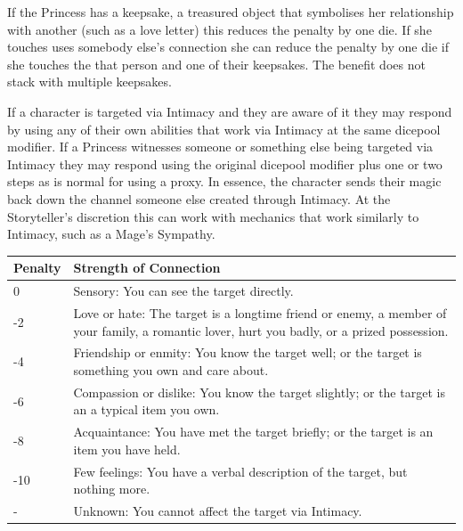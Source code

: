 If the Princess has a keepsake, a treasured object that symbolises her relationship with another (such as a love letter) this reduces the penalty by one die. If she touches uses somebody else's connection she can reduce the penalty by one die if she touches the that person and one of their keepsakes. The benefit does not stack with multiple keepsakes. 

If a character is targeted via Intimacy and they are aware of it they may respond by using any of their own abilities that work via Intimacy at the same dicepool modifier. If a Princess witnesses someone or something else being targeted via Intimacy they may respond using the original dicepool modifier plus one or two steps as is normal for using a proxy. In essence, the character sends their magic back down the channel someone else created through Intimacy. At the Storyteller's discretion this can work with mechanics that work similarly to Intimacy, such as a Mage's Sympathy. 

\begin{table}[H]
    \begin{tabularx}{\textwidth}{|l|X|}
        \hline
        Penalty & Strength of Connection                                                                            \\ \hline
        0       & Sensory: You can see the target directly.                                                         \\ \hline
        -2      & Love or hate: The target is a longtime friend or enemy, a member of your family, a romantic lover, hurt you badly, or a prized possession.       \\ \hline
        -4      & Friendship or enmity: You know the target well; or the target is something you own and care about.                         \\ \hline
        -6      & Compassion or dislike: You know the target slightly; or the target is an a typical item you own.         \\ \hline
        -8      & Acquaintance: You have met the target briefly; or the target is an item you have held.  \\ \hline
        -10     & Few feelings: You have a verbal description of the target, but nothing more.                         \\  \hline
		-       & Unknown: You cannot affect the target via Intimacy. \\
        \hline
    \end{tabularx}
\end{table}


